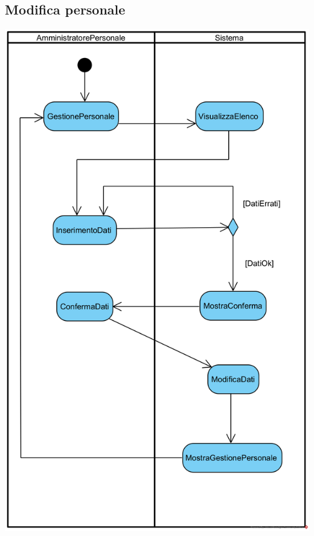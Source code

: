 \documentclass[12pt,a4paper]{article}
\begin{document}
\subsection{Modifica personale}
\begin{center}
\includegraphics[scale=1.50]{ActivityDiagram/AmministratorePersonaleModificaDipendente}
\end{center}
\end{document}

